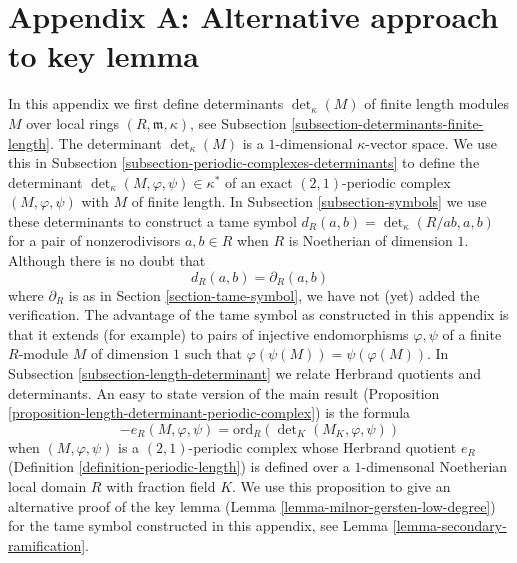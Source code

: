 \section{Appendix A: Alternative approach to key lemma}
\label{section-appendix-A}

\noindent
In this appendix we first define determinants $\det_\kappa(M)$
of finite length modules $M$ over local rings $(R, \mathfrak m, \kappa)$,
see Subsection \ref{subsection-determinants-finite-length}.
The determinant $\det_\kappa(M)$ is a $1$-dimensional $\kappa$-vector space.
We use this in Subsection \ref{subsection-periodic-complexes-determinants}
to define the determinant $\det_\kappa(M, \varphi, \psi) \in \kappa^*$
of an exact $(2, 1)$-periodic complex $(M, \varphi, \psi)$
with $M$ of finite length. In Subsection \ref{subsection-symbols}
we use these determinants to construct a tame symbol
$d_R(a, b) = \det_\kappa(R/ab, a, b)$ for a pair of nonzerodivisors
$a, b \in R$ when $R$ is Noetherian of dimension $1$.
Although there is no doubt that
$$
d_R(a, b) = \partial_R(a, b)
$$
where $\partial_R$ is as in Section \ref{section-tame-symbol},
we have not (yet) added the verification. The advantage of the
tame symbol as constructed in this appendix is that it extends
(for example) to pairs of injective endomorphisms $\varphi, \psi$
of a finite $R$-module $M$ of dimension $1$ such that
$\varphi(\psi(M)) = \psi(\varphi(M))$. In
Subsection \ref{subsection-length-determinant}
we relate Herbrand quotients and determinants.
An easy to state version of the main result
(Proposition \ref{proposition-length-determinant-periodic-complex})
is the formula
$$
-e_R(M, \varphi, \psi) =
\text{ord}_R(\det\nolimits_K(M_K, \varphi, \psi))
$$
when $(M, \varphi, \psi)$ is a $(2, 1)$-periodic complex
whose Herbrand quotient $e_R$ (Definition \ref{definition-periodic-length})
is defined
over a $1$-dimensonal Noetherian local domain $R$ with fraction field $K$.
We use this proposition to give an alternative proof of the key lemma
(Lemma \ref{lemma-milnor-gersten-low-degree})
for the tame symbol constructed in this appendix, see
Lemma \ref{lemma-secondary-ramification}.


